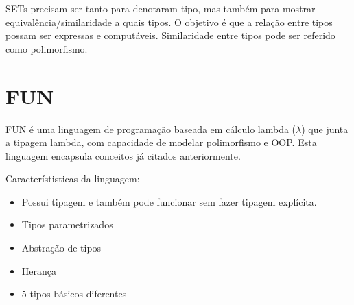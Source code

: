 \documentclass[12pt]{article}
\begin{document}
        SETs precisam ser tanto para denotaram tipo, mas também para mostrar equivalência/similaridade
        a quais tipos. O objetivo é que a relação entre tipos possam ser expressas e computáveis.
        Similaridade entre tipos pode ser referido como polimorfismo.

        \section{FUN}

        FUN é uma linguagem de programação baseada em cálculo lambda ($\lambda$) 
        que junta a tipagem lambda, com capacidade de modelar polimorfismo e OOP.
        Esta linguagem encapsula conceitos já citados anteriormente.

        Característisticas da linguagem: 

        \begin{itemize}
            \item Possui tipagem e também pode funcionar sem fazer tipagem explícita.
            \item Tipos parametrizados 
            \item Abstração de tipos 
            \item Herança 
            \item 5 tipos básicos diferentes 
        \end{itemize}

        

        
\end{document}
